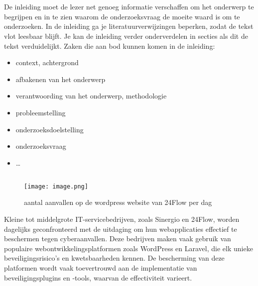 
\chapter{}%
\label{ch:inleiding}

De inleiding moet de lezer net genoeg informatie verschaffen om het onderwerp te begrijpen en in te zien waarom de onderzoeksvraag de moeite waard is om te onderzoeken. In de inleiding ga je literatuurverwijzingen beperken, zodat de tekst vlot leesbaar blijft. Je kan de inleiding verder onderverdelen in secties als dit de tekst verduidelijkt. Zaken die aan bod kunnen komen in de inleiding:

\begin{itemize}
  \item context, achtergrond
  \item afbakenen van het onderwerp
  \item verantwoording van het onderwerp, methodologie
  \item probleemstelling
  \item onderzoeksdoelstelling
  \item onderzoeksvraag
  \item \ldots
\end{itemize} 


\section{}%
\label{sec:probleemstelling}

\begin{figure}
  \centering
  \texttt{[image: image.png]}
  \caption[aantal aanvallen op de wordpress website van 24Flow per dag ]{aantal aanvallen op de wordpress website van 24Flow per dag }
\end{figure}
Kleine tot middelgrote IT-servicebedrijven, zoals Sinergio en 24Flow, worden dagelijks geconfronteerd met de uitdaging om hun 
webapplicaties effectief te beschermen tegen cyberaanvallen. Deze bedrijven maken vaak gebruik van populaire webontwikkelingsplatformen 
zoals WordPress en Laravel, die elk unieke beveiligingsrisico's en kwetsbaarheden kennen. De bescherming van deze platformen 
wordt vaak toevertrouwd aan de implementatie van beveiligingsplugins en -tools, waarvan de effectiviteit varieert.

